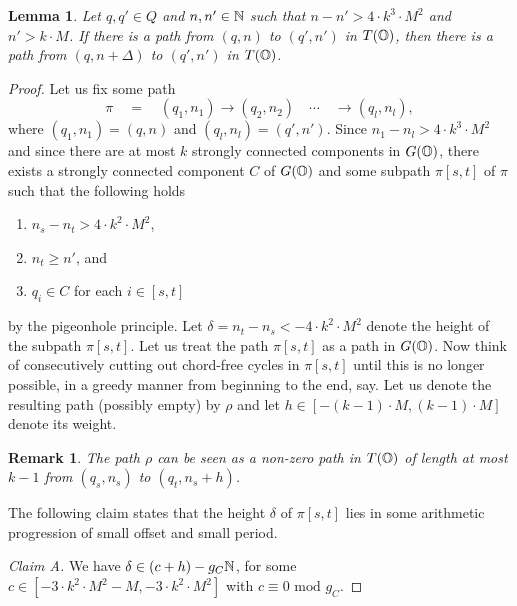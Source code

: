 \documentclass[times,envcountsame]{llncs}
\newtheorem{lemma}[theorem]{{\bf Lemma}}
\newtheorem{remark}[theorem]{{\bf Remark}}
\begin{document}
\begin{lemma}
Let $q,q'\in Q$ and $n,n'\in\mathbb{N}$ such that
$n-n'>4\cdot k^3\cdot M^2$ and
$n'>k\cdot M$.
If there is a path from $(q,n)$ to $(q',n')$ in $T(\mathbb{O})$, then there
is a path from $(q,n+\Delta)$ to $(q',n')$ in $T(\mathbb{O})$.
\end{lemma}
\begin{proof}
Let us fix some path
$$
\pi\quad=\quad(q_1,n_1)\rightarrow(q_2,n_2)\quad \cdots\quad \rightarrow (q_l,n_l),
$$
where $(q_1,n_1)=(q,n)$ and $(q_l,n_l)=(q',n')$.
Since $n_1-n_l>4\cdot k^3\cdot M^2$ and since there are at most $k$ strongly connected components in $G(\mathbb{O})$,  there
exists a strongly connected component $C$ of $G(\mathbb{O})$ and some subpath $\pi[s,t]$
of $\pi$ such that the following holds
\begin{enumerate}
\item  $n_s-n_t>4\cdot k^2\cdot M^2$,
\item $n_t\geq n'$, and
\item $q_i\in C$ for each $i\in[s,t]$
\end{enumerate}
by the pigeonhole principle.
Let $\delta=n_t-n_s<-4\cdot k^2\cdot M^2$ denote the height of the subpath $\pi[s,t]$.
Let us treat the path $\pi[s,t]$ as a path in $G(\mathbb{O})$. Now think of consecutively cutting out
chord-free cycles in $\pi[s,t]$  until this is no longer possible, in a greedy
manner from beginning to the end, say. Let us denote the resulting
path (possibly empty) by $\rho$ and let  $h\in[-(k-1)\cdot M,(k-1)\cdot M]$ denote
its weight.
\begin{remark}{\label{R rho}}
The path $\rho$ can be seen as a non-zero path in $T(\mathbb{O})$ of length at most
$k-1$ from $(q_s,n_s)$ to $(q_t,n_s+h)$.
\end{remark}

\noindent
The following claim states that the height $\delta$ of $\pi[s,t]$ lies in some
arithmetic progression of small offset and small period.


\smallskip

\noindent
{\em Claim A.} We have $\delta\in (c+h)-g_C\mathbb{N}$,
for some
$c\in[-3\cdot k^2\cdot M^2-M,-3\cdot k^2\cdot M^2]$ with $c\equiv 0\text{ mod }g_C$.

\medskip


\end{proof}
\end{document}

